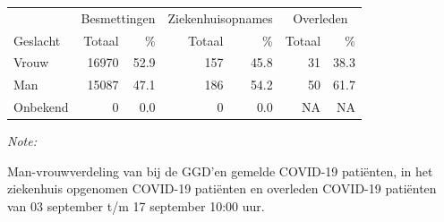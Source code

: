 \documentclass[
  english,
  man,floatsintext]{apa6}
\begin{document}
\begin{table}
\centering\begingroup\fontsize{11}{13}\selectfont

\begin{threeparttable}
\begin{tabular}{lrrrrrr}
\toprule
\multicolumn{1}{c}{ } & \multicolumn{2}{c}{Besmettingen} & \multicolumn{2}{c}{Ziekenhuisopnames} & \multicolumn{2}{c}{Overleden} \\
\cmidrule(l{3pt}r{3pt}){2-3} \cmidrule(l{3pt}r{3pt}){4-5} \cmidrule(l{3pt}r{3pt}){6-7}
Geslacht & Totaal & \% & Totaal & \% & Totaal & \%\\
\midrule
Vrouw & 16970 & 52.9 & 157 & 45.8 & 31 & 38.3\\
Man & 15087 & 47.1 & 186 & 54.2 & 50 & 61.7\\
Onbekend & 0 & 0.0 & 0 & 0.0 & NA & NA\\
\bottomrule
\end{tabular}
\begin{tablenotes}
\item \textit{Note: } 
\item Man-vrouwverdeling van bij de GGD’en gemelde COVID-19 patiënten, in het ziekenhuis opgenomen COVID-19 patiënten en overleden COVID-19 patiënten van 03 september t/m 17 september 10:00 uur.
\end{tablenotes}
\end{threeparttable}
\endgroup{}
\end{table}
\newpage
\end{document}
